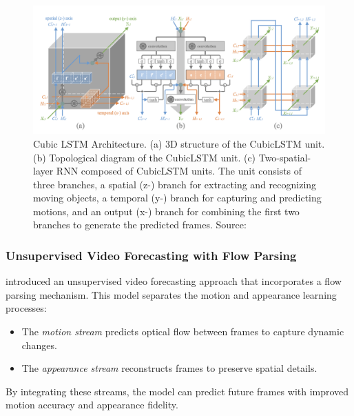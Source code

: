 \documentclass[12pt,oneside]{book} %
\begin{document}
\begin{figure}[H]
    \centering
    \includegraphics[width=1\textwidth]{figures/CubicLSTM.png}
    \caption{Cubic LSTM Architecture. (a) 3D structure of the CubicLSTM unit. (b) Topological diagram of the CubicLSTM unit. (c) Two-spatial-layer RNN composed of CubicLSTM units. The unit consists of three branches, a spatial (z-) branch for extracting and recognizing moving objects, a temporal (y-) branch for capturing and predicting motions, and an output (x-) branch for combining the first two branches to generate the predicted frames. Source:~\citet{CubicLSTMsVideoPrediction}}\label{fig:cubic-lstm}
\end{figure}

\subsubsection*{Unsupervised Video Forecasting with Flow Parsing}
\citet{UnsupervisedVideoForecastingFlowParsingMechanism} introduced an unsupervised video forecasting approach that incorporates a flow parsing mechanism. This model separates the motion and appearance learning processes:
\begin{itemize}
    \item The \textit{motion stream} predicts optical flow between frames to capture
          dynamic changes.
    \item The \textit{appearance stream} reconstructs frames to preserve spatial details.
\end{itemize}
By integrating these streams, the model can predict future frames with improved motion accuracy and appearance fidelity.
\end{document}
